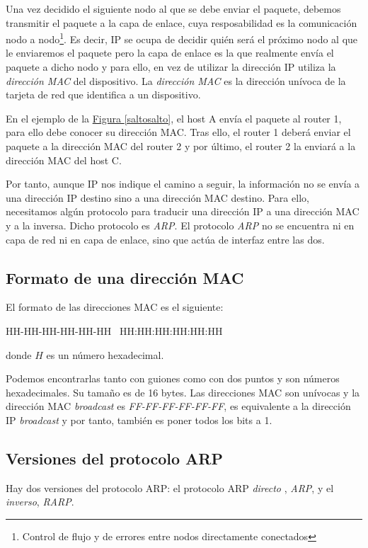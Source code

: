 \documentclass[10pt,a4paper,spanish]{report}
\begin{document}
Una vez decidido el siguiente nodo al que se debe enviar el paquete, debemos transmitir el paquete a la capa de enlace, cuya resposabilidad es la comunicación nodo a nodo\footnote{Control de flujo y de errores entre nodos directamente conectados}. Es decir, IP se ocupa de decidir quién será el próximo nodo al que le enviaremos el paquete pero la capa de enlace es la que realmente envía el paquete a dicho nodo y para ello, en vez de utilizar la dirección IP utiliza la \textit{\textcolor{tema4}{dirección MAC}} del dispositivo. La \textit{\textcolor{tema4}{dirección MAC}} es la dirección unívoca de la tarjeta de red que identifica a un dispositivo.

En el ejemplo de la \hyperref[saltosalto]{Figura \ref*{saltosalto}}, el host A envía el paquete al router 1, para ello debe conocer su dirección MAC. Tras ello, el router 1 deberá enviar el paquete a la dirección MAC del router 2 y por último, el router 2 la enviará a la dirección MAC del host C. 

Por tanto, aunque IP nos indique el camino a seguir, la información no se envía a una dirección IP destino sino a una dirección MAC destino. Para ello, necesitamos algún protocolo para traducir una dirección IP a una dirección MAC y a la inversa. Dicho protocolo es \textit{\textcolor{tema4}{ARP}}. El protocolo \textit{\textcolor{tema4}{ARP}} no se encuentra ni en capa de red ni en capa de enlace, sino que actúa de interfaz entre las dos.

\subsection{\textcolor{tema4}Formato de una dirección MAC}
El formato de las direcciones MAC es el siguiente:

\begin{center}
  HH-HH-HH-HH-HH-HH \qquad\ HH:HH:HH:HH:HH:HH

  donde $H$ es un número hexadecimal.
\end{center}

Podemos encontrarlas tanto con guiones como con dos puntos y son números hexadecimales. Su tamaño es de 16 bytes. Las direcciones MAC son unívocas y la dirección MAC \textit{\textcolor{tema4}{broadcast}} es \textit{\textcolor{tema4}{FF-FF-FF-FF-FF-FF}}, es equivalente a la dirección IP \textit{\textcolor{tema4}{broadcast}} y por tanto, también es poner todos los bits a 1.

\subsection{\textcolor{tema4}Versiones del protocolo ARP}
Hay dos versiones del protocolo ARP: el protocolo ARP \textit{\textcolor{tema4}{directo}} , \textit{\textcolor{tema4}{ARP}}, y el \textit{\textcolor{tema4}{inverso}}, \textit{\textcolor{tema4}{RARP}}. 
\end{document}
